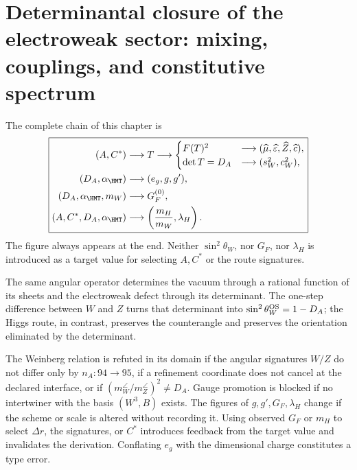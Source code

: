 \section{Determinantal closure of the electroweak sector: mixing, couplings, and constitutive spectrum}

The complete chain of this chapter is
\begin{equation}
\label{eq:ew-causal-diagram}
\boxed{
\begin{aligned}
(A,C^*)&\longrightarrow T
\longrightarrow
\begin{cases}
F(T)^2&\longrightarrow
(\widehat\mu,\widehat\varepsilon,\widehat Z,\widehat c),\\
\det T=D_A&\longrightarrow
(s_W^2,c_W^2),
\end{cases}\\
(D_A,\alpha_{\HMT})&\longrightarrow(e_g,g,g'),\\
(D_A,\alpha_{\HMT},m_W)&\longrightarrow G_F^{(0)},\\
(A,C^*,D_A,\alpha_{\HMT})&\longrightarrow
\left(\frac{m_H}{m_W},\lambda_H\right).
\end{aligned}}
\end{equation}
The figure always appears at the end. Neither \(\sin^2\theta_W\), nor
\(G_F\), nor \(\lambda_H\) is introduced as a target value for selecting
\(A,C^*\) or the route signatures.

\begin{proposition}
The same angular operator determines the vacuum through a rational function
of its sheets and the electroweak defect through its determinant. The
one-step difference between \(W\) and \(Z\) turns that determinant into
\(\sin^2\theta_W^{\rm OS}=1-D_A\); the Higgs route, in contrast, preserves
the counterangle and preserves the orientation eliminated by the determinant.
\end{proposition}

\begin{remark}
The Weinberg relation is refuted in its domain if the angular
signatures \(W/Z\) do not differ only by \(n_A:94\to95\), if a refinement
coordinate does not cancel at the declared interface, or if
\((m_W^{\angle}/m_Z^{\angle})^2\neq D_A\). Gauge promotion is
blocked if no intertwiner with the basis \((W^3,B)\) exists. The figures
of \(g,g',G_F,\lambda_H\) change if the scheme or scale is altered without
recording it. Using observed \(G_F\) or \(m_H\) to select
\(\Delta r\), the signatures, or \(C^*\) introduces feedback from the
target value and invalidates the derivation. Conflating \(e_g\) with the dimensional
charge constitutes a type error.
\end{remark}

